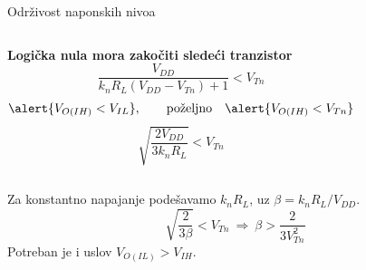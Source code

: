 \begin{frame}[label=09_1-s023]{Održivost naponskih nivoa}\setlength{\parskip}{2pt}\setlength{\abovedisplayskip}{4pt}\setlength{\belowdisplayskip}{4pt}\setlength{\abovedisplayshortskip}{3pt}\setlength{\belowdisplayshortskip}{3pt}
\begin{columns}[T,onlytextwidth]\centering {}\textbf{Logička nula mora zakočiti sledeći tranzistor}
\[\frac{V_{DD}}{k_nR_L(V_{DD}-V_{Tn})+1}<V_{Tn}\]
\[\alert{V_{O(IH)}<V_{IL}},\qquad\text{poželjno}\quad\alert{V_{O(IH)}<V_{Tn}}\]
\[\sqrt{\frac{2V_{DD}}{3k_nR_L}}<V_{Tn}\]
\end{columns}\medskip Za konstantno napajanje podešavamo $k_nR_L$, uz $\beta=k_nR_L/V_{DD}$.\[\sqrt{\frac2{3\beta}}<V_{Tn}\ \Rightarrow\ \beta>\frac2{3V_{Tn}^2}\]
Potreban je i uslov \alert{$V_{O(IL)}>V_{IH}$}.
\end{frame}
